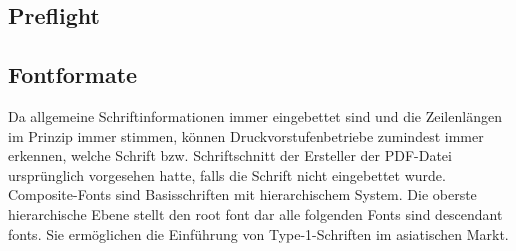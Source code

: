 \subsection{Preflight}

\subsection{Fontformate}
Da allgemeine Schriftinformationen immer eingebettet sind und die Zeilenlängen im Prinzip immer stimmen, können Druckvorstufenbetriebe zumindest immer erkennen, welche Schrift bzw. Schriftschnitt der Ersteller der PDF-Datei ursprünglich vorgesehen hatte, falls die Schrift nicht eingebettet wurde.
Composite-Fonts sind Basisschriften mit hierarchischem System. Die oberste hierarchische Ebene stellt den root font dar alle folgenden Fonts sind descendant fonts. Sie ermöglichen die Einführung von Type-1-Schriften im asiatischen Markt. \cite{schneeberger}